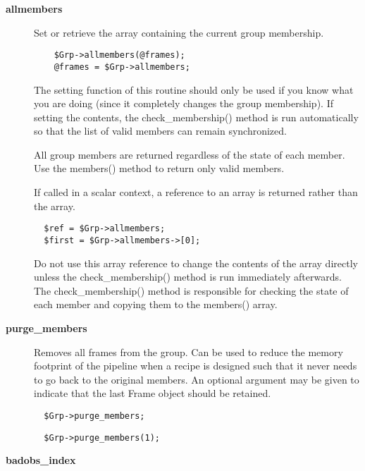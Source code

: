\begin{description}

\item[{\textbf{allmembers}}] \mbox{}

Set or retrieve the array containing the current group membership.

\begin{verbatim}
    $Grp->allmembers(@frames);
    @frames = $Grp->allmembers;
\end{verbatim}


The setting function of this routine should only be used
if you know what you are doing (since it completely changes the group
membership). If setting the contents, the check\_membership() method
is run automatically so that the list of valid members can remain
synchronized.



All group members are returned regardless of the state of each member.
Use the members() method to return only valid members.



If called in a scalar context, a reference to an array is returned
rather than the array.

\begin{verbatim}
  $ref = $Grp->allmembers;
  $first = $Grp->allmembers->[0];
\end{verbatim}


Do not use this array reference to change the contents of the array
directly unless the check\_membership() method is run immediately
afterwards. The check\_membership() method is responsible for
checking the state of each member and copying them to the members()
array.


\item[{\textbf{purge\_members}}] \mbox{}

Removes all frames from the group. Can be used to reduce the memory
footprint of the pipeline when a recipe is designed such that it never
needs to go back to the original members. An optional argument may be
given to indicate that the last Frame object should be retained.

\begin{verbatim}
  $Grp->purge_members;
\end{verbatim}
\begin{verbatim}
  $Grp->purge_members(1);
\end{verbatim}

\item[{\textbf{badobs\_index}}] \mbox{}


\end{description}
